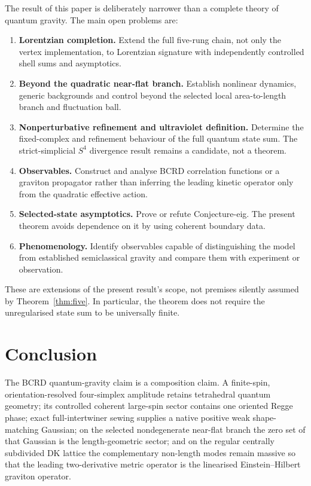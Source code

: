 \documentclass[11pt]{article}
\numberwithin{equation}{section}
\begin{document}
The result of this paper is deliberately narrower than a complete theory of quantum gravity. The main open problems are:
\begin{enumerate}[label=(\alph*)]
\item \textbf{Lorentzian completion.} Extend the full five-rung chain, not only the vertex implementation, to Lorentzian signature with independently controlled shell sums and asymptotics.
\item \textbf{Beyond the quadratic near-flat branch.} Establish nonlinear dynamics, generic backgrounds and control beyond the selected local area-to-length branch and fluctuation ball.
\item \textbf{Nonperturbative refinement and ultraviolet definition.} Determine the fixed-complex and refinement behaviour of the full quantum state sum. The strict-simplicial $S^4$ divergence result remains a candidate, not a theorem.
\item \textbf{Observables.} Construct and analyse BCRD correlation functions or a graviton propagator rather than inferring the leading kinetic operator only from the quadratic effective action.
\item \textbf{Selected-state asymptotics.} Prove or refute Conjecture-eig. The present theorem avoids dependence on it by using coherent boundary data.
\item \textbf{Phenomenology.} Identify observables capable of distinguishing the model from established semiclassical gravity and compare them with experiment or observation.
\end{enumerate}

These are extensions of the present result's scope, not premises silently assumed by Theorem~\ref{thm:five}. In particular, the theorem does not require the unregularised state sum to be universally finite.

\section{Conclusion}

The BCRD quantum-gravity claim is a composition claim. A finite-spin, orientation-resolved four-simplex amplitude retains tetrahedral quantum geometry; its controlled coherent large-spin sector contains one oriented Regge phase; exact full-intertwiner sewing supplies a native positive weak shape-matching Gaussian; on the selected nondegenerate near-flat branch the zero set of that Gaussian is the length-geometric sector; and on the regular centrally subdivided DK lattice the complementary non-length modes remain massive so that the leading two-derivative metric operator is the linearised Einstein--Hilbert graviton operator.
\end{document}
